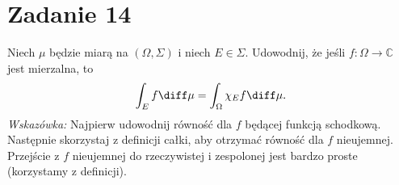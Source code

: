 \section[\nierozwiazane{Zadanie 14}]{Zadanie 14}
Niech \(\mu\) będzie miarą na \((\Omega, \Sigma)\) i niech \(E \in \Sigma\).
Udowodnij, że jeśli \(f \colon \Omega \to \mathbb{C}\) jest mierzalna, to
\[
	\int_E f \diff\mu = \int_\Omega \chi_E f \diff\mu.
\]
\textit{Wskazówka:} Najpierw udowodnij równość dla \(f\) będącej funkcją schodkową. Następnie
skorzystaj z definicji całki, aby otrzymać równość dla \(f\) nieujemnej. Przejście z \(f\)
nieujemnej do rzeczywistej i zespolonej jest bardzo proste (korzystamy z definicji).

\brakrozwiazania
